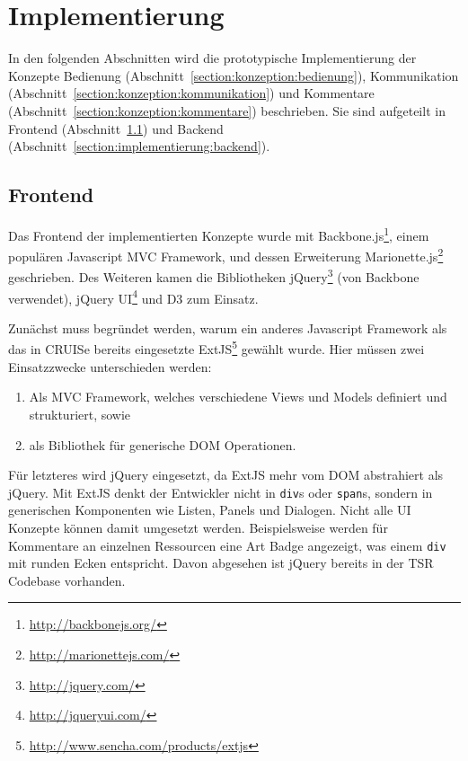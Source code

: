 \documentclass[
	headsepline,
	footsepline,
	fontsize=12pt,
	bibliography=totoc
]{scrbook}
\begin{document}

\chapter{Implementierung}
\label{chapter:implementierung}

In den folgenden Abschnitten wird die prototypische Implementierung der Konzepte Bedienung (Abschnitt~\ref{section:konzeption:bedienung}), Kommunikation (Abschnitt~\ref{section:konzeption:kommunikation}) und Kommentare (Abschnitt~\ref{section:konzeption:kommentare}) beschrieben. Sie sind aufgeteilt in Frontend (Abschnitt~\ref{section:implementierung:frontend}) und Backend (Abschnitt~\ref{section:implementierung:backend}).

\section{Frontend}
\label{section:implementierung:frontend}

Das Frontend der implementierten Konzepte wurde mit Backbone.js\footnote{\url{http://backbonejs.org/}}, einem populären Javascript MVC Framework, und dessen Erweiterung Marionette.js\footnote{\url{http://marionettejs.com/}} geschrieben. Des Weiteren kamen die Bibliotheken jQuery\footnote{\url{http://jquery.com/}} (von Backbone verwendet), jQuery UI\footnote{\url{http://jqueryui.com/}} und D3 \cite{Bostock2011} zum Einsatz.

Zunächst muss begründet werden, warum ein anderes Javascript Framework als das in CRUISe bereits eingesetzte ExtJS\footnote{\url{http://www.sencha.com/products/extjs}} gewählt wurde. Hier müssen zwei Einsatzzwecke unterschieden werden:

\begin{enumerate}
	\item Als MVC Framework, welches verschiedene Views und Models definiert und strukturiert, sowie
	\item als Bibliothek für generische DOM Operationen.
\end{enumerate}

Für letzteres wird jQuery eingesetzt, da ExtJS mehr vom DOM abstrahiert als jQuery. Mit ExtJS denkt der Entwickler nicht in \texttt{div}s oder \texttt{span}s, sondern in generischen Komponenten wie Listen, Panels und Dialogen. Nicht alle UI Konzepte können damit umgesetzt werden. Beispielsweise werden für Kommentare an einzelnen Ressourcen eine Art Badge angezeigt, was einem \texttt{div} mit runden Ecken entspricht. Davon abgesehen ist jQuery bereits in der TSR Codebase vorhanden.
\end{document}
